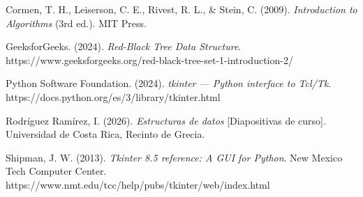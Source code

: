 \documentclass[11pt]{article}
\begin{document}
\begin{list}{}{\setlength{\leftmargin}{1.27cm}\setlength{\itemindent}{-1.27cm}\setlength{\itemsep}{6pt}}

    \item Cormen, T. H., Leiserson, C. E., Rivest, R. L., \& Stein, C. (2009). \textit{Introduction to Algorithms} (3rd ed.). MIT Press.

    \item GeeksforGeeks. (2024). \textit{Red-Black Tree Data Structure}. https://www.geeksforgeeks.org/red-black-tree-set-1-introduction-2/

    \item Python Software Foundation. (2024). \textit{tkinter --- Python interface to Tcl/Tk}. https://docs.python.org/es/3/library/tkinter.html

    \item Rodríguez Ramírez, I. (2026). \textit{Estructuras de datos} [Diapositivas de curso]. Universidad de Costa Rica, Recinto de Grecia.

    \item Shipman, J. W. (2013). \textit{Tkinter 8.5 reference: A GUI for Python}. New Mexico Tech Computer Center. https://www.nmt.edu/tcc/help/pubs/tkinter/web/index.html

\end{list}
\end{document}
